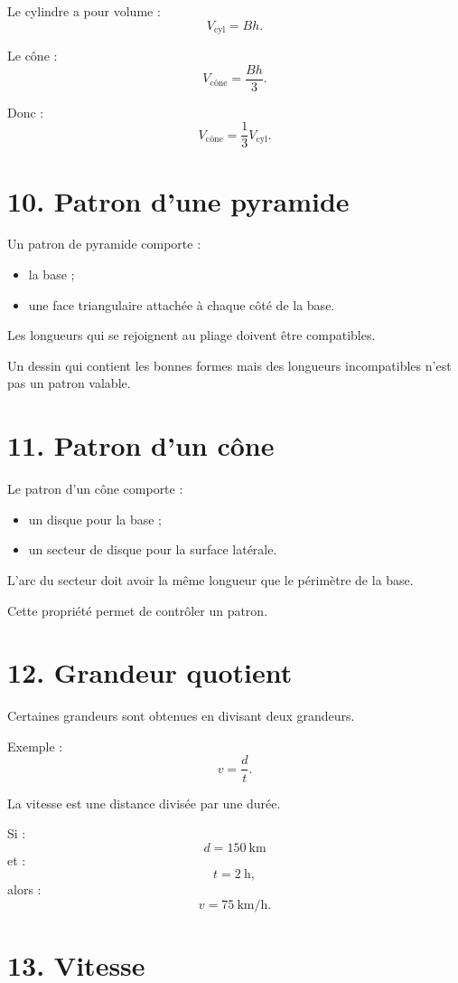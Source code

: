 Le cylindre a pour volume :
\[
V_{\text{cyl}}=Bh.
\]

Le cône :
\[
V_{\text{cône}}=\dfrac{Bh}{3}.
\]

Donc :
\[
\boxed{
V_{\text{cône}}=\dfrac13V_{\text{cyl}}
}.
\]

\section{10. Patron d'une pyramide}

Un patron de pyramide comporte :
\begin{itemize}
\item la base ;
\item une face triangulaire attachée à chaque côté de la base.
\end{itemize}

Les longueurs qui se rejoignent au pliage doivent être compatibles.

Un dessin qui contient les bonnes formes mais des longueurs incompatibles n'est pas un patron valable.

\section{11. Patron d'un cône}

Le patron d'un cône comporte :
\begin{itemize}
\item un disque pour la base ;
\item un secteur de disque pour la surface latérale.
\end{itemize}

L'arc du secteur doit avoir la même longueur que le périmètre de la base.

Cette propriété permet de contrôler un patron.

\section{12. Grandeur quotient}

Certaines grandeurs sont obtenues en divisant deux grandeurs.

Exemple :
\[
v=\dfrac dt.
\]

La vitesse est une distance divisée par une durée.

Si :
\[
d=150\ \text{km}
\]
et :
\[
t=2\ \text{h},
\]
alors :
\[
v=75\ \text{km/h}.
\]

\section{13. Vitesse}

